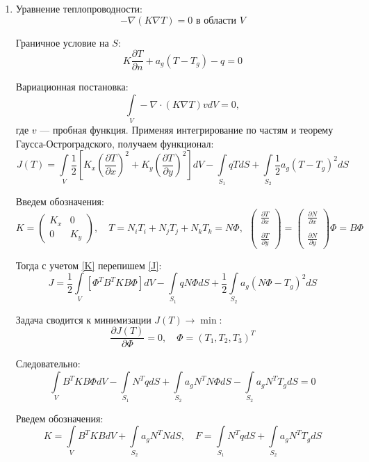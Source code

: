 \documentclass[a4paper, 12pt]{article}
\begin{document}
\begin{enumerate}
\item Уравнение теплопроводности:
\[-\nabla(K\nabla T) = 0 \text{ в области } V\]

Граничное условие на $S$:
\[
K \frac{\partial T}{\partial n} + a_g (T - T_g) - q = 0
\]

Вариационная постановка:
\[
\int\limits_V -\nabla \cdot (K \nabla T) v dV = 0,
\]
где \( v \) — пробная функция. Применяя интегрирование по частям и теорему Гаусса-Остроградского, получаем функционал:
\begin{equation}\label{J}
J(T) = \int\limits_V \frac{1}{2} 
\left[ K_x \left( \frac{\partial T}{\partial x} \right)^2 + K_y \left( \frac{\partial T}{\partial y} \right)^2 \right] dV 
- \int\limits_{S_1} q T dS 
+ \int\limits_{S_2} \frac{1}{2} a_g (T - T_g)^2 dS
\end{equation}

Введем обозначения:
\begin{equation}\label{K}
K = 
\begin{pmatrix}
K_x & 0 \\
0 & K_y
\end{pmatrix}, 
\quad T = N_i T_i + N_j T_j + N_k T_k = N \Phi, \ \ 
\begin{pmatrix}
\displaystyle\frac{\partial T}{\partial x} \\ \\
\displaystyle\frac{\partial T}{\partial y}
\end{pmatrix} 
= 
\begin{pmatrix}
\displaystyle\frac{\partial N}{\partial x} \\ \\
\displaystyle\frac{\partial N}{\partial y}
\end{pmatrix} \Phi= B \Phi
\end{equation}

Тогда с учетом \eqref{K} перепишем \eqref{J}:
\[
J = \frac{1}{2} \int\limits_V \left[ \Phi^T B^T K B \Phi \right] dV - \int\limits_{S_1} q N \Phi dS + \frac{1}{2} \int\limits_{S_2} a_g (N \Phi - T_g)^2 dS
\]

Задача сводится к минимизации \( J(T) \to \min \):
\[
\frac{\partial J(T)}{\partial \Phi} = 0, \quad \Phi = (T_1, T_2, T_3)^T
\]

Следовательно:
\[
\int\limits_V B^T K B \Phi dV - \int\limits_{S_1} N^T q dS + \int\limits_{S_2} a_g N^T N \Phi dS - \int\limits_{S_2} a_g N^T T_g dS = 0
\]

Рведем обозначения:
\[
K = \int\limits_V B^T K B dV + \int\limits_{S_2} a_g N^T N dS, \quad F = \int\limits_{S_1} N^T q dS + \int\limits_{S_2} a_g N^T T_g dS
\]


\end{enumerate}
\end{document}
